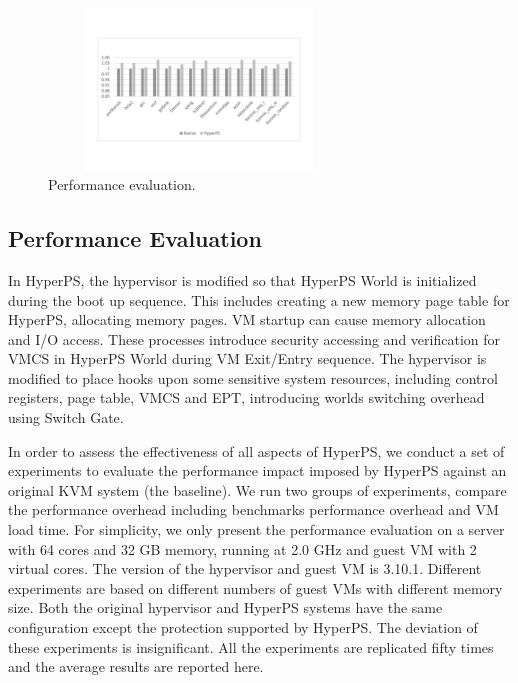 \documentclass[conference]{IEEEtran}
\begin{document}
\begin{figure}
\centerline{\includegraphics[width=8cm,height=4.3cm]{performance2.pdf}}
\caption{Performance evaluation.} \label{fig5}
\end{figure}


\subsection{Performance Evaluation}

In HyperPS, the hypervisor is modified so that HyperPS World is initialized during the boot up sequence. This includes creating a new memory page table for HyperPS, allocating memory pages. VM startup can cause memory allocation and I/O access. 
These processes introduce security accessing and verification for VMCS in HyperPS World during VM Exit/Entry sequence.
The hypervisor is modified to place hooks upon some sensitive system resources, including control registers, page table, VMCS and EPT,
introducing worlds switching overhead using Switch Gate.

In order to assess the effectiveness of all aspects of HyperPS, we conduct a set of experiments to evaluate the performance impact imposed by HyperPS against an original KVM system (the baseline). We run two groups of experiments, compare the performance overhead including benchmarks performance overhead and VM load time.
For simplicity, we only present the performance evaluation on a server with 64 cores and 32 GB memory, running at 2.0 GHz and guest VM with 2 virtual cores. The version of the hypervisor and guest VM is 3.10.1. Different experiments are based on different numbers of guest VMs with different memory size. Both the original hypervisor and HyperPS systems have the same configuration except the protection supported by HyperPS. The deviation of these experiments is insignificant. All the experiments are replicated fifty times and the average results are reported here.
\end{document}
